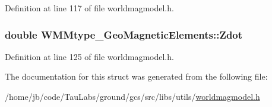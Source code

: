 \-Definition at line 117 of file worldmagmodel.\-h.

\hypertarget{struct_w_m_mtype___geo_magnetic_elements_a105c49de1702144d115e20ba6272a2c6}{
\subsubsection[{\-Zdot}]{\setlength{\rightskip}{0pt plus 5cm}double {\bf \-W\-M\-Mtype\-\_\-\-Geo\-Magnetic\-Elements\-::\-Zdot}}}\label{struct_w_m_mtype___geo_magnetic_elements_a105c49de1702144d115e20ba6272a2c6}


\-Definition at line 125 of file worldmagmodel.\-h.



\-The documentation for this struct was generated from the following file\-:\begin{DoxyCompactItemize}
\item 
/home/jb/code/\-Tau\-Labs/ground/gcs/src/libs/utils/\hyperlink{worldmagmodel_8h}{worldmagmodel.\-h}\end{DoxyCompactItemize}
